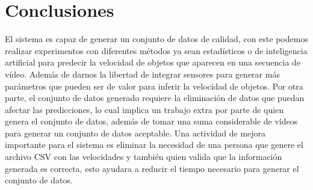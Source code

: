 \documentclass{llncs}
\begin{document}
\section{Conclusiones}
El sistema es capaz de generar un conjunto de datos de calidad, con este podemos realizar experimentos con diferentes métodos ya sean estadísticos o de inteligencia artificial para predecir la velocidad de objetos que aparecen en una secuencia de vídeo. Además de darnos la libertad de integrar sensores para generar más parámetros que pueden ser de valor para inferir la velocidad de objetos. Por otra parte, el conjunto de datos generado requiere la eliminación de datos que puedan afectar las predicciones, lo cual implica un trabajo extra por parte de quien genera el conjunto de datos, además de tomar una suma considerable de vídeos para generar un conjunto de datos aceptable. Una actividad de mejora importante para el sistema es eliminar la necesidad de una persona que genere el archivo CSV con las velocidades y también quien valida que la información generada es correcta, esto ayudara a reducir el tiempo necesario para generar el conjunto de datos.

%
%
%



\end{document}
